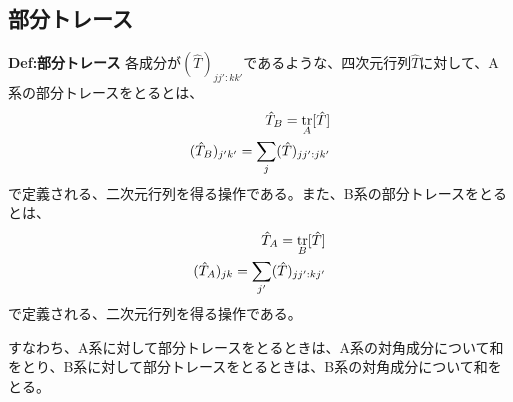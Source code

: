 \documentclass[a4paper,11pt]{jsarticle}
\begin{document}
\subsection{部分トレース}
\begin{itembox}[l]{\textbf{Def:部分トレース}}
    各成分が$(\hat{T})_{jj':kk'}$であるような、四次元行列$\hat{T}$に対して、A系の部分トレースをとるとは、
    \begin{align}
        \hat{T}_{B} = \underset{A}{\trace}[\hat{T}]\\
        (\hat{T}_B)_{j'k'} = \sum_{j}(\hat{T})_{jj':jk'}
    \end{align}
    で定義される、二次元行列を得る操作である。また、B系の部分トレースをとるとは、
    \begin{align}
        \hat{T}_{A} = \underset{B}{\trace}[\hat{T}]\\
        (\hat{T}_A)_{jk} = \sum_{j'}(\hat{T})_{jj':kj'}
    \end{align}
    で定義される、二次元行列を得る操作である。
\end{itembox}
すなわち、A系に対して部分トレースをとるときは、A系の対角成分について和をとり、B系に対して部分トレースをとるときは、B系の対角成分について和をとる。\\
\end{document}
